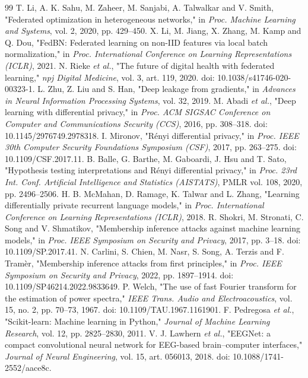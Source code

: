 \documentclass[12pt,a4paper,oneside]{report}
\begin{document}
\begin{thebibliography}{99}
 T. Li, A. K. Sahu, M. Zaheer, M. Sanjabi, A. Talwalkar and V. Smith, "Federated optimization in heterogeneous networks," in \emph{Proc. Machine Learning and Systems}, vol. 2, 2020, pp. 429--450.
 X. Li, M. Jiang, X. Zhang, M. Kamp and Q. Dou, "FedBN: Federated learning on non-IID features via local batch normalization," in \emph{Proc. International Conference on Learning Representations (ICLR)}, 2021.
 N. Rieke \emph{et al.}, "The future of digital health with federated learning," \emph{npj Digital Medicine}, vol. 3, art. 119, 2020. doi: 10.1038/s41746-020-00323-1.
 L. Zhu, Z. Liu and S. Han, "Deep leakage from gradients," in \emph{Advances in Neural Information Processing Systems}, vol. 32, 2019.
 M. Abadi \emph{et al.}, "Deep learning with differential privacy," in \emph{Proc. ACM SIGSAC Conference on Computer and Communications Security (CCS)}, 2016, pp. 308--318. doi: 10.1145/2976749.2978318.
 I. Mironov, "Rényi differential privacy," in \emph{Proc. IEEE 30th Computer Security Foundations Symposium (CSF)}, 2017, pp. 263--275. doi: 10.1109/CSF.2017.11.
 B. Balle, G. Barthe, M. Gaboardi, J. Hsu and T. Sato, "Hypothesis testing interpretations and Rényi differential privacy," in \emph{Proc. 23rd Int. Conf. Artificial Intelligence and Statistics (AISTATS)}, PMLR vol. 108, 2020, pp. 2496--2506.
 H. B. McMahan, D. Ramage, K. Talwar and L. Zhang, "Learning differentially private recurrent language models," in \emph{Proc. International Conference on Learning Representations (ICLR)}, 2018.
 R. Shokri, M. Stronati, C. Song and V. Shmatikov, "Membership inference attacks against machine learning models," in \emph{Proc. IEEE Symposium on Security and Privacy}, 2017, pp. 3--18. doi: 10.1109/SP.2017.41.
 N. Carlini, S. Chien, M. Nasr, S. Song, A. Terzis and F. Tramèr, "Membership inference attacks from first principles," in \emph{Proc. IEEE Symposium on Security and Privacy}, 2022, pp. 1897--1914. doi: 10.1109/SP46214.2022.9833649.
 P. Welch, "The use of fast Fourier transform for the estimation of power spectra," \emph{IEEE Trans. Audio and Electroacoustics}, vol. 15, no. 2, pp. 70--73, 1967. doi: 10.1109/TAU.1967.1161901.
 F. Pedregosa \emph{et al.}, "Scikit-learn: Machine learning in Python," \emph{Journal of Machine Learning Research}, vol. 12, pp. 2825--2830, 2011.
 V. J. Lawhern \emph{et al.}, "EEGNet: a compact convolutional neural network for EEG-based brain--computer interfaces," \emph{Journal of Neural Engineering}, vol. 15, art. 056013, 2018. doi: 10.1088/1741-2552/aace8c.

\end{thebibliography}
\end{document}
